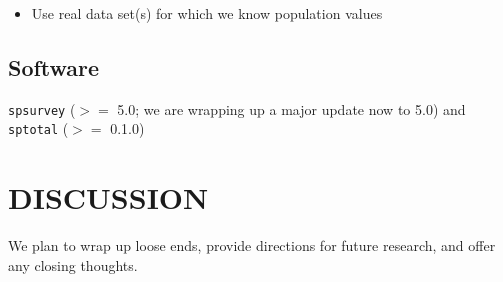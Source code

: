 \begin{itemize}
  \item Use real data set(s) for which we know population values 
\end{itemize}

\subsection{Software}

\texttt{spsurvey} ($>=$ 5.0; we are wrapping up a major update now to 5.0) and \texttt{sptotal} ($>=$ 0.1.0)


\section{\centering DISCUSSION}\label{sec:discussion}

We plan to wrap up loose ends, provide directions for future research, and offer any closing thoughts.




\clearpage






